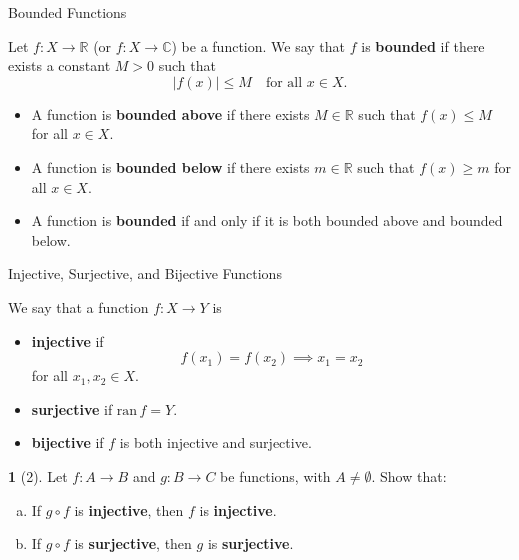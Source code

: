 \documentclass[dvipsnames]{beamer}
\theoremstyle{plain}
\theoremstyle{definition}
\newtheorem{exercise}[theorem]{\translate{Exercise}}
\begin{document}
\begin{frame}{Bounded Functions}

\begin{definition}
Let \(f : X \to \mathbb{R}\) (or \(f : X \to \mathbb{C}\)) be a function. We say that \(f\) is \textbf{bounded} if there exists a constant \(M > 0\) such that
\[
|f(x)| \le M \quad \text{for all } x \in X.
\]
\end{definition}

\begin{itemize}
    \item A function is \textbf{bounded above} if there exists \(M \in \mathbb{R}\) such that \(f(x) \le M\) for all \(x \in X\).
    \item A function is \textbf{bounded below} if there exists \(m \in \mathbb{R}\) such that \(f(x) \ge m\) for all \(x \in X\).
    \item A function is \textbf{bounded} if and only if it is both bounded above and bounded below.
\end{itemize}

\end{frame}

\begin{frame}{Injective, Surjective, and Bijective Functions}

\begin{definition}
We say that a function \(f : X \to Y\) is
\begin{itemize}
    \item \textbf{injective} if 
    \[
    f(x_1) = f(x_2) \implies x_1 = x_2
    \]
    for all \(x_1, x_2 \in X\).

    \item \textbf{surjective} if \(\mathrm{ran}\,f = Y\).

    \item \textbf{bijective} if \(f\) is both injective and surjective.
\end{itemize}
\end{definition}

\begin{exercise}[2]
Let \(f : A \to B\) and \(g : B \to C\) be functions, with \(A \neq \emptyset\). Show that:

\begin{enumerate}[(a)]
    \item If \(g \circ f\) is \textbf{injective}, then \(f\) is \textbf{injective}.
    \item If \(g \circ f\) is \textbf{surjective}, then \(g\) is \textbf{surjective}.
\end{enumerate}
\end{exercise}

\end{frame}
\end{document}
